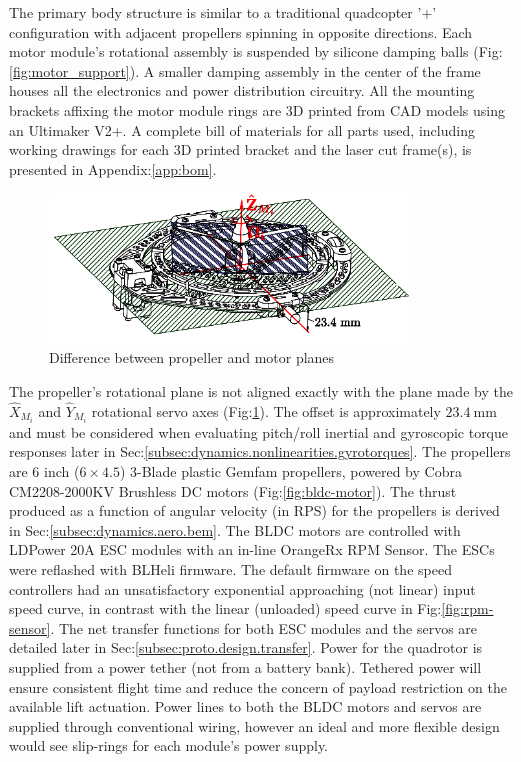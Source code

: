 \par
The primary body structure is similar to a traditional quadcopter '+' configuration with adjacent propellers spinning in opposite directions. Each motor module's rotational assembly is suspended by silicone damping balls (Fig:\ref{fig:motor_support}). A smaller damping assembly in the center of the frame houses all the electronics and power distribution circuitry. All the mounting brackets affixing the motor module rings are 3D printed from CAD models using an Ultimaker V2+\cite{ultimaker}. A complete bill of materials for all parts used, including working drawings for each 3D printed bracket and the laser cut frame(s), is presented in Appendix:\ref{app:bom}.
\par
\begin{figure}[hbtp]
\centering
\includegraphics[width=0.85\textwidth]{figs/motor-prop}
\vspace{-10pt}
\caption{Difference between propeller and motor planes}
\label{fig:motor_prop}
\vspace{-15pt}
\end{figure}
The propeller's rotational plane is not aligned exactly with the plane made by the $\hat{X}_{M_i}$ and $\hat{Y}_{M_i}$ rotational servo axes (Fig:\ref{fig:motor_prop}). The offset is approximately $23.4~\text{mm}$ and must be considered when evaluating pitch/roll inertial and gyroscopic torque responses later in Sec:\ref{subsec:dynamics.nonlinearities.gyrotorques}. The propellers are 6 inch ($6 \times 4.5$) 3-Blade plastic Gemfam propellers, powered by Cobra CM2208-2000KV Brushless DC motors (Fig:\ref{fig:bldc-motor}). The thrust produced as a function of angular velocity (in RPS) for the propellers is derived in Sec:\ref{subsec:dynamics.aero.bem}. 
\newpage
The BLDC motors are controlled with LDPower 20A ESC modules with an in-line OrangeRx RPM Sensor. The ESCs were reflashed with BLHeli\cite{BLHeli} firmware. The default firmware on the speed controllers had an unsatisfactory exponential approaching (not linear) input speed curve, in contrast with the linear (unloaded) speed curve in Fig:\ref{fig:rpm-sensor}. The net transfer functions for both ESC modules and the servos are detailed later in Sec:\ref{subsec:proto.design.transfer}. Power for the quadrotor is supplied from a power tether (not from a battery bank). Tethered power will ensure consistent flight time and reduce the concern of payload restriction on the available lift actuation. Power lines to both the BLDC motors and servos are supplied through conventional wiring, however an ideal and more flexible design would see slip-rings for each module's power supply. 
